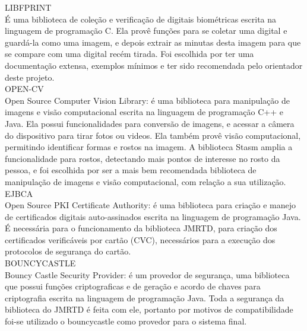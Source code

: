 \documentclass{article}
\begin{document}
\begin{justify}
        \hspace*{2cm}LIBFPRINT\cite{PRINT}\\
    \hspace*{2cm}É uma biblioteca de coleção e verificação de digitais biométricas escrita na linguagem de programação C. Ela provê funções para se coletar uma digital e guardá-la como uma imagem, e depois extrair as minutas desta imagem para que se compare com uma digital recém tirada. Foi escolhida por ter uma documentação extensa, exemplos mínimos e ter sido recomendada pelo orientador deste projeto.\\
		
        \hspace*{2cm}OPEN-CV\cite{OPENCV}\\
    \hspace*{2cm}Open Source Computer Vision Library: é uma biblioteca para manipulação de imagens e visão computacional escrita na linguagem de programação C++ e Java. Ela possui funcionalidades para conversão de imagens, e acessar a câmera do dispositivo para tirar fotos ou videos. Ela também provê visão computacional, permitindo identificar formas e rostos na imagem. A biblioteca Stasm amplia a funcionalidade para rostos, detectando mais pontos de interesse no rosto da pessoa, e foi escolhida por ser a mais bem recomendada biblioteca de manipulação de imagens e visão computacional, com relação a sua utilização.\\
		
        \hspace*{2cm}EJBCA\cite{EJBCA}\\
    \hspace*{2cm}Open Source PKI Certificate Authority: é uma biblioteca para criação e manejo de certificados digitais auto-assinados escrita na linguagem de programação Java. É necessária para o funcionamento da biblioteca JMRTD, para criação dos certificados verificáveis por cartão (CVC), necessários para a execução dos protocolos de segurança do cartão.\\
		
        \hspace*{2cm}BOUNCYCASTLE\cite{BOUNCYCASTLE}\\
    \hspace*{2cm}Bouncy Castle Security Provider: é um provedor de segurança, uma biblioteca que possui funções criptograficas e de geração e acordo de chaves para criptografia escrita na linguagem de programação Java. Toda a segurança da biblioteca do JMRTD é feita com ele, portanto por motivos de compatibilidade foi-se utilizado o bouncycastle como provedor para o sistema final.\\

			
		\end{justify}
\end{document}
